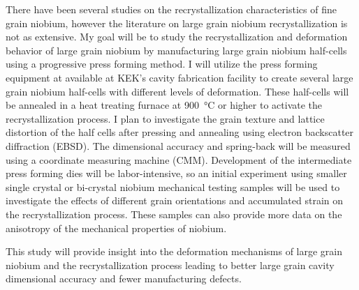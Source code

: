 \documentclass[]{revtex4-2}
\begin{document}
    There have been several studies on the recrystallization characteristics of fine grain niobium, however the literature on large grain niobium recrystallization is not as extensive. My goal will be to study the recrystallization and deformation behavior of large grain niobium by  manufacturing large grain niobium half-cells using a progressive press forming method. I will utilize the press forming equipment at available at KEK's cavity fabrication facility to create several large grain niobium half-cells with different levels of deformation. These half-cells will be annealed in a heat treating furnace at \qty{900}{\degreeCelsius} or higher to activate the recrystallization process. I plan to investigate the grain texture and lattice distortion of the half cells after pressing and annealing using electron backscatter diffraction (EBSD). The dimensional accuracy and spring-back will be measured using a coordinate measuring machine (CMM). Development of the intermediate press forming dies will be labor-intensive, so an initial experiment using smaller single crystal or bi-crystal niobium mechanical testing samples will be used to investigate the effects of different grain orientations and accumulated strain on the recrystallization process. These samples can also provide more data on the anisotropy of the mechanical properties of niobium.
    
    This study will provide insight into the deformation mechanisms of large grain niobium and the recrystallization process leading to better large grain cavity dimensional accuracy and fewer manufacturing defects.







\end{document}
